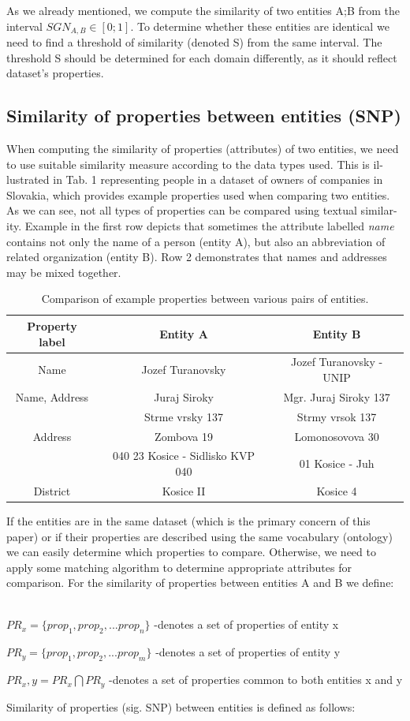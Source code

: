 \documentclass{llncs}
\begin{document}
As we already mentioned, we compute the similarity of two entities A;B from
the interval $SGN_{A,B} \in [0; 1]$. To determine whether these entities are identical
we need to find a threshold of similarity (denoted S) from the same interval.
The threshold S should be determined for each domain differently, as it should
reflect dataset's properties.

\subsection{Similarity of properties between entities (SNP)}

When computing the similarity of properties (attributes) of two entities, we need
to use suitable similarity measure according to the data types used. This is il-
lustrated in Tab. 1 representing people in a dataset of owners of companies in
Slovakia, which provides example properties used when comparing two entities.
As we can see, not all types of properties can be compared using textual similar-
ity. Example in the first row depicts that sometimes the attribute labelled \textit{name}
contains not only the name of a person (entity A), but also an abbreviation of
related organization (entity B). Row 2 demonstrates that names and addresses
may be mixed together.
\begin{table}[ht]
 \centering
 \caption{Comparison of example properties between various pairs of entities.}
 \begin{tabular}{|c||c|c|}
	\hline
Property label & Entity A & Entity B\\
\hline
\hline
Name & Jozef Turanovsky & Jozef Turanovsky - UNIP\\
\hline
Name, Address & Juraj Siroky & Mgr. Juraj Siroky 137\\
               &  Strme vrsky 137 & Strmy vrsok 137\\
\hline
Address &       Zombova 19  &      Lomonosovova 30\\
       & 040 23 Kosice - Sidlisko KVP 040 & 01 Kosice - Juh\\
\hline
District & Kosice II & Kosice 4\\
  \hline	
	\end{tabular}
\end{table}	
If the entities are in the same dataset (which is the primary concern of this paper)
or if their properties are described using the same vocabulary (ontology) we can
easily determine which properties to compare. Otherwise, we need to apply some
matching algorithm to determine appropriate attributes for comparison. For the
similarity of properties between entities A and B we define:
\\
\\
\begin{flushleft}
$ PR_x = \{prop_1,prop_2,...prop_n\} $ -denotes a set of properties of entity x

$ PR_y = \{prop_1,prop_2,...prop_m\} $ -denotes a set of properties of entity y

$ PR_x,y = PR_x \bigcap PR_y $ -denotes a set of properties common to both entities x and y
\end{flushleft}
Similarity of properties (sig. SNP) between entities is defined as follows:
\end{document}
